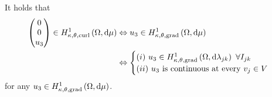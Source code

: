 \begin{prop} \label{prop:Curl3rdComponentIFFInGradSpace}
It holds that
\begin{align*}
	\begin{pmatrix} 0 \\ 0 \\ u_3 \end{pmatrix}\in\ktcurlSob{\ddom}{\ddmes} &\Leftrightarrow 
	u_3\in\ktgradSob{\ddom}{\ddmes} \\
	&\Leftrightarrow	\begin{cases} (i) \ u_3\in\ktgradSob{\ddom}{\lambda_{jk}} \ \forall I_{jk} \\ (ii) \ u_3 \text{ is continuous at every } v_j\in V	\end{cases}
\end{align*}
for any $u_3\in H^1_{\kappa,\theta,\mathrm{grad}}\left( \Omega, \mathrm{d}\mu \right)$.
\end{prop}
